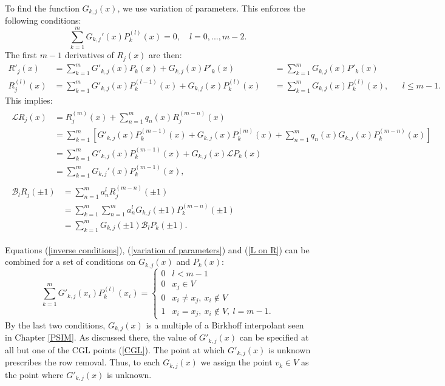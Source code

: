 \documentclass{sfuthesis}
\begin{document}
To find the function $G_{k,j}(x)$, we use variation of parameters.
This enforces the following conditions:
\begin{equation} \label{variation of parameters}
\sum_{k=1}^m G_{k,j}'(x) P_k^{(l)}(x) = 0, \quad l = 0,...,m-2 .
\end{equation}
The first $m-1$ derivatives of $R_j(x)$ are then:
\begin{equation}
\begin{aligned}
R'_j(x) & = \sum_{k=1}^m G'_{k,j}(x) P_k(x) + G_{k,j}(x) P'_k(x) && = \sum_{k=1}^m G_{k,j}(x) P'_k(x) \\
R_j^{(l)}(x) & = \sum_{k=1}^m G'_{k,j}(x) P_k^{(l-1)}(x) + G_{k,j}(x) P_k^{(l)}(x) && = \sum_{k=1}^m G_{k,j}(x) P_k^{(l)}(x), && l \leq m-1 .
\end{aligned}
\end{equation}
This implies:
\begin{align} \label{L on R}
\begin{split}
\mathcal{L} R_j(x) & = R_j^{(m)}(x) + \sum_{n=1}^m q_n(x) R_j^{(m-n)}(x) \\
& = \sum_{k=1}^m \left [ G'_{k,j}(x) P_k^{(m-1)}(x) + G_{k,j}(x) P_k^{(m)}(x) + \sum_{n=1}^m q_n(x) G_{k,j}(x) P_k^{(m-n)}(x) \right ] \\
& = \sum_{k=1}^m G'_{k,j}(x) P_k^{(m-1)}(x) + G_{k,j}(x) \mathcal{L} P_k(x) \\
& = \sum_{k=1}^m G_{k,j}'(x) P_k^{(m-1)}(x) ,
\end{split} \\
\begin{split} \label{B on R}
\mathcal{B}_l R_j(\pm 1) & = \sum_{n=1}^m a_n^l R_j^{(m-n)}(\pm1) \\
& = \sum_{k=1}^m \sum_{n=1}^m a_n^l G_{k,j}(\pm1) P_k^{(m-n)}(\pm1) \\
& = \sum_{k=1}^m G_{k,j}(\pm1) \mathcal{B}_l P_k(\pm1) .
\end{split}
\end{align}

Equations (\ref{inverse conditions}), (\ref{variation of parameters}) and (\ref{L on R}) can be combined for a set of conditions on $G_{k,j}(x)$ and $P_k(x)$:
\begin{equation} \label{combined conditions}
\sum_{k=1}^m G'_{k,j}(x_i) P_k^{(l)}(x_i) = \begin{cases} 0 & l < m-1 \\
0 & x_j \in V \\
0 & x_i \neq x_j, \ x_i \notin V \\
1 & x_i = x_j, \ x_i \notin V , \ l = m-1.\end{cases} 
\end{equation}
By the last two conditions, $G_{k,j}(x)$ is a multiple of a Birkhoff interpolant seen in Chapter \ref{PSIM}.
As discussed there, the value of $G'_{k,j}(x)$ can be specified at all but one of the CGL points (\ref{CGL}).
The point at which $G'_{k,j}(x)$ is unknown prescribes the row removal.
Thus, to each $G_{k,j}(x)$ we assign the point $v_k \in V$ as the point where $G'_{k,j}(x)$ is unknown.
\end{document}

